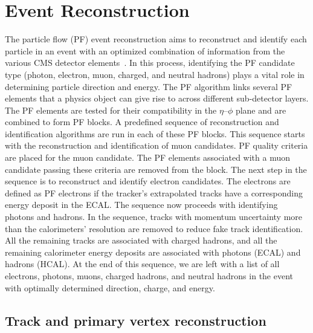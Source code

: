 %
%

\chapter{Event Reconstruction}
\label{event_reco}

The particle flow (PF) event reconstruction aims to reconstruct and identify each particle in an event with an optimized combination of information from the various CMS detector elements~\cite{Sirunyan:2017ulk}. In this process, identifying the PF candidate type (photon, electron, muon, charged, and neutral hadrons) plays a vital role in determining particle direction and energy. The PF algorithm links several PF elements that a physics object can give rise to across different sub-detector layers. The PF elements are tested for their compatibility in the $\eta$--$\phi$ plane and are combined to form PF blocks. A predefined sequence of reconstruction and identification algorithms are run in each of these PF blocks. This sequence starts with the reconstruction and identification of muon candidates. PF quality criteria are placed for the muon candidate. The PF elements associated with a muon candidate passing these criteria are removed from the block. The next step in the sequence is to reconstruct and identify electron candidates. The electrons are defined as PF electrons if the tracker's extrapolated tracks have a corresponding energy deposit in the ECAL. The sequence now proceeds with identifying photons and hadrons. In the sequence, tracks with momentum uncertainty more than the calorimeters' resolution are removed to reduce fake track identification. All the remaining tracks are associated with charged hadrons, and all the remaining calorimeter energy deposits are associated with photons (ECAL) and hadrons (HCAL). At the end of this sequence, we are left with a list of all electrons, photons, muons, charged hadrons, and neutral hadrons in the event with optimally determined direction, charge, and energy.


\section{Track and primary vertex reconstruction}

